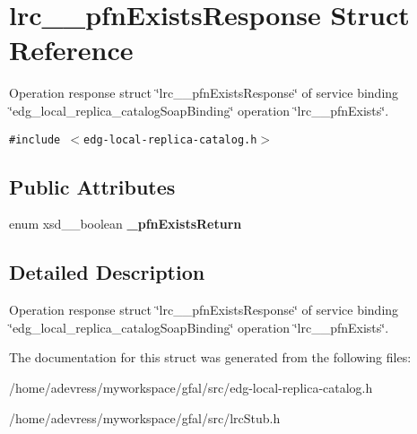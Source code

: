 \section{lrc\_\-\_\-pfn\-Exists\-Response Struct Reference}
\label{structlrc____pfnExistsResponse}
Operation response struct \char`\"{}lrc\_\-\_\-pfn\-Exists\-Response\char`\"{} of service binding \char`\"{}edg\_\-local\_\-replica\_\-catalog\-Soap\-Binding\char`\"{} operation \char`\"{}lrc\_\-\_\-pfn\-Exists\char`\"{}.  


{\tt \#include $<$edg-local-replica-catalog.h$>$}

\subsection*{Public Attributes}
\begin{CompactItemize}
\item 
enum xsd\_\-\_\-boolean \textbf{\_\-pfn\-Exists\-Return}\label{structlrc____pfnExistsResponse_70f671b5d862e54250506aaaa7ff3832}

\end{CompactItemize}


\subsection{Detailed Description}
Operation response struct \char`\"{}lrc\_\-\_\-pfn\-Exists\-Response\char`\"{} of service binding \char`\"{}edg\_\-local\_\-replica\_\-catalog\-Soap\-Binding\char`\"{} operation \char`\"{}lrc\_\-\_\-pfn\-Exists\char`\"{}. 



The documentation for this struct was generated from the following files:\begin{CompactItemize}
\item 
/home/adevress/myworkspace/gfal/src/edg-local-replica-catalog.h\item 
/home/adevress/myworkspace/gfal/src/lrc\-Stub.h\end{CompactItemize}
